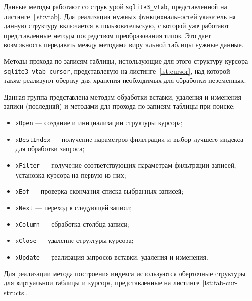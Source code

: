 
Данные методы работают со структурой \texttt{sqlite3\_vtab}, представленной на
листинге~\ref{lst:vtab}. Для реализации нужных функциональностей указатель на
данную структуру включается в пользовательскую, с которой уже работают
представленные методы посредством преобразования типов. Это дает возможность
передавать между методами вирутальной таблицы нужные данные.


Методы прохода по записям таблицы, использующие для этого структуру курсора
\texttt{sqlite3\_vtab\_cursor}, представленую на листинге~\ref{lst:cursor}, над
которой также реализуют обертку для хранения необходимых для обработки
переменных.


Данная группа представлена методом обработки вставки, удаления и
изменения записи (последний) и методами для прохода по записям таблицы
при поиске:
\begin{itemize}
    \item \texttt{xOpen} --- создание и инициализации структуры курсора;
    \item \texttt{xBestIndex} --- получение параметров фильтрации и
        выбор лучшего индекса для обработки запроса;
    \item \texttt{xFilter} --- получение соответствующих параметрам
        фильтрации записей, установка курсора на первую из них;
    \item \texttt{xEof} --- проверка окончания списка выбранных записей;
    \item \texttt{xNext} --- переход к следующей записи;
    \item \texttt{xColumn} --- обработка столбца записи;
    \item \texttt{xClose} --- удаление структуры курсора;
    \item \texttt{xUpdate} --- реализация запросов вставки, удаления и
        изменения.
\end{itemize}

Для реализации метода построения индекса используются оберточные структуры для
виртуальной таблицы и курсора, представленные на
листинге~\ref{lst:tab-cur-structs}.


